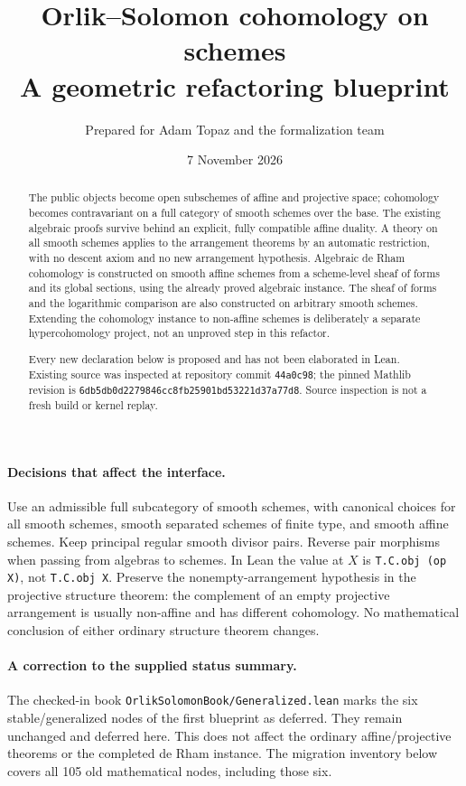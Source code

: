 \documentclass[11pt]{article}
\title{Orlik--Solomon cohomology on schemes\\\large A geometric refactoring blueprint}
\author{Prepared for Adam Topaz and the formalization team}
\date{7 November 2026}
\newcommand{\planned}[1]{\texttt{\detokenize{#1}}}
\theoremstyle{definition}
\theoremstyle{remark}
\renewcommand{\planned}[1]{\nolinkurl{#1}}
\begin{document}
\maketitle
\begin{abstract}
The public objects become open subschemes of affine and projective space; cohomology becomes contravariant on a full category of smooth schemes over the base. The existing algebraic proofs survive behind an explicit, fully compatible affine duality. A theory on all smooth schemes applies to the arrangement theorems by an automatic restriction, with no descent axiom and no new arrangement hypothesis. Algebraic de Rham cohomology is constructed on smooth affine schemes from a scheme-level sheaf of forms and its global sections, using the already proved algebraic instance. The sheaf of forms and the logarithmic comparison are also constructed on arbitrary smooth schemes. Extending the cohomology instance to non-affine schemes is deliberately a separate hypercohomology project, not an unproved step in this refactor.

Every new declaration below is proposed and has not been elaborated in Lean. Existing source was inspected at repository commit \texttt{44a0c98}; the pinned Mathlib revision is \texttt{6db5db0d2279846cc8fb25901bd53221d37a77d8}. Source inspection is not a fresh build or kernel replay.
\end{abstract}
\paragraph{Decisions that affect the interface.}
Use an admissible full subcategory of smooth schemes, with canonical choices for all smooth schemes, smooth separated schemes of finite type, and smooth affine schemes. Keep principal regular smooth divisor pairs. Reverse pair morphisms when passing from algebras to schemes. In Lean the value at $X$ is \planned{T.C.obj (op X)}, not \planned{T.C.obj X}. Preserve the nonempty-arrangement hypothesis in the projective structure theorem: the complement of an empty projective arrangement is usually non-affine and has different cohomology. No mathematical conclusion of either ordinary structure theorem changes.

\paragraph{A correction to the supplied status summary.}
The checked-in book \planned{OrlikSolomonBook/Generalized.lean} marks the six stable/generalized nodes of the first blueprint as deferred. They remain unchanged and deferred here. This does not affect the ordinary affine/projective theorems or the completed de Rham instance. The migration inventory below covers all 105 old mathematical nodes, including those six.
\tableofcontents
\newpage
\end{document}
